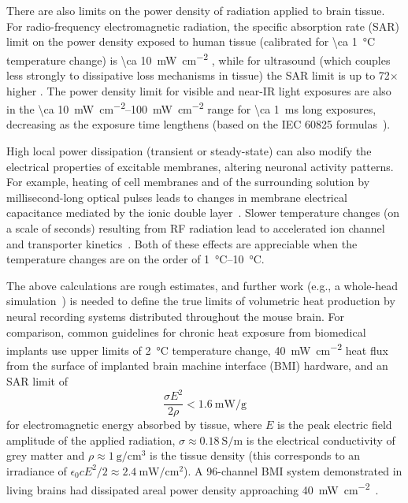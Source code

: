 There are also limits on the power density of radiation applied to brain tissue.
For radio-frequency electromagnetic radiation, the specific absorption rate (SAR) limit on the power density exposed to human tissue (calibrated for \SI{\ca 1}{\celsius} temperature change) is \SI{\ca 10}{\milli\watt\per\centi\meter\squared} \cite{IEEE_RF_standard}, while for ultrasound (which couples less strongly to dissipative loss mechanisms in tissue) the SAR limit is up to 72$\times$ higher \cite{FDA_ultrasound_standard}.
The power density limit for visible and near-IR light exposures are also in the \SIrange{\ca 10}{100}{\milli\watt\per\centi\meter\squared} range for \SI{\ca 1}{\milli\second} long exposures, decreasing as the exposure time lengthens (based on the IEC 60825 formulas~\cite{iec60825}).

High local power dissipation (transient or steady-state) can also modify the electrical properties of excitable membranes, altering neuronal activity patterns.
For example, heating of cell membranes and of the surrounding solution by millisecond-long optical pulses leads to changes in membrane electrical capacitance mediated by the ionic double layer~\cite{shapiro12}.
Slower temperature changes (on a scale of seconds) resulting from RF radiation lead to accelerated ion channel and transporter kinetics~\cite{shapiro13}.
Both of these effects are appreciable when the temperature changes are on the order of \SIrange{1}{10}{\degreeCelsius}.

The above calculations are rough estimates, and further work (e.g., a whole-head simulation~\cite{Lazzi2005}) is needed to define the true limits of volumetric heat production by neural recording systems distributed throughout the mouse brain. For comparison, common guidelines for chronic heat exposure from biomedical implants \cite{Wolf2008} use upper limits of \SI{2}{\celsius} temperature change, \SI{40}{\milli\watt\per\centi\meter\squared} heat flux from the surface of implanted brain machine interface (BMI) hardware, and an SAR limit of \[\frac{\sigma E^2}{2 \rho} < \SI{1.6}{\milli\watt\per\gram}\] for electromagnetic energy absorbed by tissue, where $E$ is the peak electric field amplitude of the applied radiation, $\sigma \approx \SI{0.18}{\siemens\per\meter}$ is the electrical conductivity of grey matter and $\rho \approx \SI{1}{\gram\per\centi\meter\cubed}$ is the tissue density \cite{Lazzi2005} (this corresponds to an irradiance of $\epsilon_0 c E^2 / 2 \approx \SI{2.4}{\milli\watt\per\centi\meter\squared}$). A 96-channel BMI system demonstrated in living brains had dissipated areal power density approaching \SI{40}{\milli\watt\per\centi\meter\squared}~\cite{rizk2009}.

